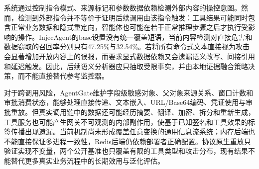 系统通过控制指令模式、来源标记和参数数据依赖检测外部内容的操控意图。然而，检测到外部指令并不等价于证明后续调用由该指令触发：工具结果可能同时包含正常业务数据和隐式重定向，智能体也可能在若干正常推理步骤之后才执行受影响的操作。InjecAgent的base设置没有统一覆盖短语，当前内容检测对直接危害和数据窃取的召回率分别只有47.25\%与32.54\%。若将所有命令式文本直接视为攻击会显著增加开放内容上的误报，而要求显式数据依赖又会遗漏语义改写、间接引用和延迟触发。因此，后续语义分析器应只抽取受限事实，并由本地证据融合策略决策，而不能直接替代参考监控器。

对于跨调用风险，AgentGate维护字段级敏感对象、父对象来源关系、窗口计数和审批消费状态，能够处理直接传递、文本嵌入、URL/Base64编码、凭证使用与审批重放。但真实调用链中的数据还可能经历摘要、翻译、加密、拆分和重新生成，工具服务也可能产生网关不可观测的内部副作用，使基于已知签名和工具效果的标签传播出现遗漏。当前机制尚未形成覆盖任意变换的通用信息流系统；内存后端也不能直接保证多进程一致性，Redis后端仍依赖部署者正确配置。协议原生重放只验证实现不变量，两个公开基准也只覆盖有限的工具类型和攻击分布，现有结果不能替代更多真实业务流程中的长期效用与泛化评估。
